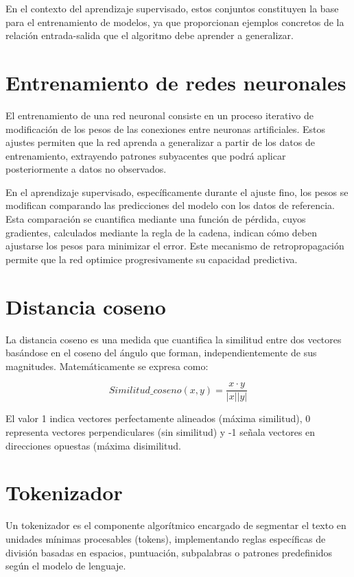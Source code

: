 En el contexto del aprendizaje supervisado, estos conjuntos constituyen la base para el entrenamiento de modelos, ya que proporcionan ejemplos concretos de la relación entrada-salida que el algoritmo debe aprender a generalizar.



\section{Entrenamiento de redes neuronales}
\label{anexo:entrenamiento}
El entrenamiento de una red neuronal consiste en un proceso iterativo de modificación de los pesos de las conexiones entre neuronas artificiales. Estos ajustes permiten que la red aprenda a generalizar a partir de los datos de entrenamiento, extrayendo patrones subyacentes que podrá aplicar posteriormente a datos no observados.

En el aprendizaje supervisado, específicamente durante el ajuste fino, los pesos se modifican comparando las predicciones del modelo con los datos de referencia. Esta comparación se cuantifica mediante una función de pérdida, cuyos gradientes, calculados mediante la regla de la cadena, indican cómo deben ajustarse los pesos para minimizar el error. Este mecanismo de retropropagación permite que la red optimice progresivamente su capacidad predictiva.

\section{Distancia coseno}
\label{anexo:dis_cos}
La distancia coseno es una medida que cuantifica la similitud entre dos vectores basándose en el coseno del ángulo que forman, independientemente de sus magnitudes. Matemáticamente se expresa como: 

\[Similitud\_coseno(x,y) = \frac{x \cdot y}{|x||y|}\]

El valor 1 indica vectores perfectamente alineados (máxima similitud), 0 representa vectores perpendiculares (sin similitud) y -1 señala vectores en direcciones opuestas (máxima disimilitud.

\section{Tokenizador}
\label{anexo:tokenizer}
Un tokenizador es el componente algorítmico encargado de segmentar el texto en unidades mínimas procesables (tokens), implementando reglas específicas de división basadas en espacios, puntuación, subpalabras o patrones predefinidos según el modelo de lenguaje.

